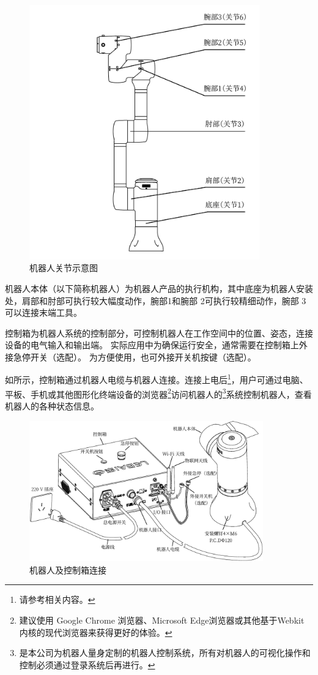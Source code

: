 \begin{figure}[ht]
    \centering
    \includegraphics[height=11cm]{image/arms.pdf}
    \caption{机器人关节示意图}
    \label{fig:机器人关节示意图}
\end{figure}

机器人本体（以下简称机器人）为机器人产品的执行机构，其中底座为机器人安装处，肩部和肘部可执行较大幅度动作，腕部1和腕部 2可执行较精细动作，腕部 3 可以连接末端工具。

\clearpage

控制箱为机器人系统的控制部分，可控制机器人在工作空间中的位置、姿态，连接设备的电气输入和输出端。%
实际应用中为确保运行安全，通常需要在控制箱上外接急停开关（选配）。%
为方便使用，也可外接开关机按键（选配）。

如所示，控制箱通过机器人电缆与机器人连接。连接上电后\footnote{请参考相关内容。}，用户可通过电脑、平板、手机或其他图形化终端设备的浏览器\footnote{建议使用 Google Chrome 浏览器、Microsoft Edge浏览器或其他基于Webkit 内核的现代浏览器来获得更好的体验。 }访问机器人的\LM\footnote{\LM 是本公司为机器人量身定制的机器人控制系统，所有对机器人的可视化操作和控制必须通过登录\LM 系统后再进行。}系统控制机器人，查看机器人的各种状态信息。

\begin{figure}[h!]
    \centering
    \includegraphics[width=0.9\textwidth]{line_graphs/robot_links.pdf}
    \caption{机器人及控制箱连接}
    \label{fig:机器人本体及控制箱连接}
\end{figure}

